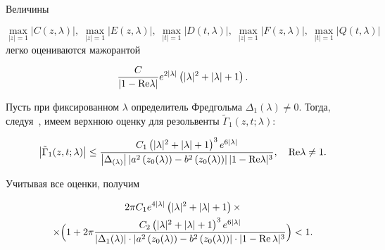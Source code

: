 


Величины 

$$

\max \limits_{|z| = 1} \left| C(z,\lambda )\right|,\; 

\max \limits_{|z| = 1} \left| E(z,\lambda )\right|,\; 

\max \limits_{|t| = 1} \left| D(t,\lambda )\right|,\;  

\max \limits_{|z| = 1} \left| F(z,\lambda ) \right|,\; 

\max \limits_{|t| = 1} \left| Q(t,\lambda ) \right|$$ легко оцениваются мажорантой

\[

\frac{C}{|1 - {\rm Re} \lambda |}e^{2|\lambda |} \left(|\lambda |^2  + |\lambda | + 1 \right).

\]



Пусть при фиксированном $\lambda$ определитель Фредгольма $\Delta _1 (\lambda ) \ne 0$. Тогда, следуя~\cite{iman:bib15}, имеем верхнюю оценку для резольвенты $\tilde \Gamma _1 (z,t;\lambda )$:

\[

\left| \tilde \Gamma _1 (z,t;\lambda ) \right| \le \frac{C_1 \left(|\lambda |^2  + |\lambda | + 1 \right)^3 e^{6|\lambda |} }{\left| \Delta_{(\lambda )} \right|   \left| a^2 \left(z_0 (\lambda )\right) - b^2 \left(z_0 (\lambda )\right) \right|   |1 - {\rm Re} \lambda|^3}, \quad {\rm Re} \lambda  \ne 1.

\]



Учитывая все оценки, получим

\begin{multline}

\label{iman:eq8}

2\pi C_1 e^{4|\lambda |} \left(|\lambda |^2+|\lambda|+1\right)\times\\

\times \Bigl(1+2\pi\frac{C_2\left(|\lambda |^2+|\lambda|+1 \right)^3 e^{6|\lambda |} }

{\left| \Delta_1 (\lambda ) \right| \cdot  \left|a^2\left(z_0 (\lambda )\right) - b^2 \left(z_0 (\lambda ) \right)\right| \cdot  |1 - \mathop{\rm Re} \lambda |^3 }\Bigr) < 1.

\end{multline}

